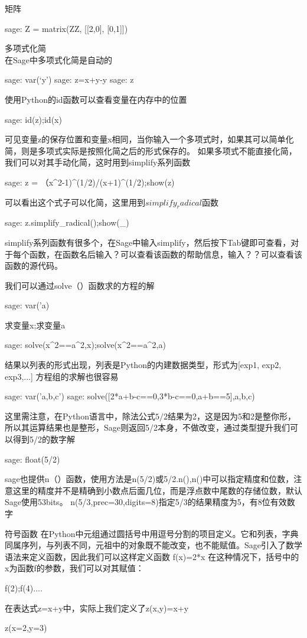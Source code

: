 \documentclass[a4paper]{article}
\begin{document}
\begin{multicols}{2}
矩阵 
\begin{sageblock}
	sage: Z = matrix(ZZ, [[2,0], [0,1]])
\end{sageblock}  
多项式化简 \\
在Sage中多项式化简是自动的
\begin{sageblock}
	sage: var(`y')
	sage: z=x+y-y
	sage: z
\end{sageblock}
使用Python的id函数可以查看变量在内存中的位置
\begin{sageblock}
	sage: id(z);id(x)
\end{sageblock}
可见变量z的保存位置和变量x相同，当你输入一个多项式时，如果其可以简单化简，则是多项式实际是按照化简之后的形式保存的。
如果多项式不能直接化简，我们可以对其手动化简，这时用到simplify系列函数
\begin{sageblock}
	sage: z = （x^2-1)^(1/2)/(x+1)^(1/2);show(z)
\end{sageblock}
可以看出这个式子可以化简，这里用到$simplify_radical$函数
\begin{sageblock}
	sage: z.simplify_radical();show(_)
\end{sageblock}
simplify系列函数有很多个，在Sage中输入simplify，然后按下Tab键即可查看，对于每个函数，在函数名后输入？可以查看该函数的帮助信息，输入？？可以查看该函数的源代码。

我们可以通过solve（）函数求的方程的解
\begin{sageblock}
	sage: var('a)
\end{sageblock}
求变量x;求变量a
\begin{sageblock}
	sage: solve(x^2==a^2,x);solve(x^2==a^2,a)
\end{sageblock}
结果以列表的形式出现，列表是Python的内建数据类型，形式为[exp1, exp2, exp3,...]
方程组的求解也很容易
\begin{sageblock}
	sage: var('a,b,c')
	sage: solve([2*a+b-c==0,3*b-c==0,a+b==5],a,b,c)
\end{sageblock}
这里需注意，在Python语言中，除法公式$5/2$结果为2，这是因为5和2是整你形，所以其运算结果也是整形，Sage则返回5/2本身，不做改变，通过类型提升我们可以得到5/2的数字解
\begin{sageblock}
	sage: float(5/2)
\end{sageblock}
sage也提供n（）函数，使用方法是n(5/2)或5/2.n(),n()中可以指定精度和位数，注意这里的精度并不是精确到小数点后面几位，而是浮点数中尾数的存储位数，默认Sage使用53bits。
n(5/3,prec=30,digits=8)指定5/3的结果精度为5，有8位有效数字

符号函数
在Python中元组通过圆括号中用逗号分割的项目定义。它和列表，字典同属序列，与列表不同，元祖中的对象既不能改变，也不能赋值。Sage引入了数学语法来定义函数，因此我们可以这样定义函数
f(x)=2*x
在这种情况下，括号中的x为函数f的参数，我们可以对其赋值：
\begin{sagecommandline}
	f(2);f(4)....
\end{sagecommandline}
在表达式z=x+y中，实际上我们定义了z(x,y)=x+y
\begin{sagecommandline}
	z(x=2,y=3)
\end{sagecommandline}


\end{multicols}
\end{document}
